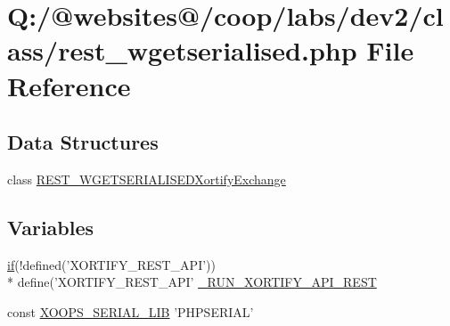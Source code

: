 \hypertarget{rest__wgetserialised_8php}{\section{Q\-:/@websites@/coop/labs/dev2/class/rest\-\_\-wgetserialised.php File Reference}
\label{rest__wgetserialised_8php}
}
\subsection*{Data Structures}
\begin{DoxyCompactItemize}
\item 
class \hyperlink{class_r_e_s_t___w_g_e_t_s_e_r_i_a_l_i_s_e_d_xortify_exchange}{R\-E\-S\-T\-\_\-\-W\-G\-E\-T\-S\-E\-R\-I\-A\-L\-I\-S\-E\-D\-Xortify\-Exchange}
\end{DoxyCompactItemize}
\subsection*{Variables}
\begin{DoxyCompactItemize}
\item 
\hyperlink{index_8php_ae2ccdf355624402b65fc2226f2a661cd}{if}(!defined('X\-O\-R\-T\-I\-F\-Y\-\_\-\-R\-E\-S\-T\-\_\-\-A\-P\-I')) \\*
define('X\-O\-R\-T\-I\-F\-Y\-\_\-\-R\-E\-S\-T\-\_\-\-A\-P\-I' \hyperlink{rest__wgetserialised_8php_a731f04083e48e3087b2f5cad38672473}{\-\_\-\-R\-U\-N\-\_\-\-X\-O\-R\-T\-I\-F\-Y\-\_\-\-A\-P\-I\-\_\-\-R\-E\-S\-T}
\item 
const \hyperlink{rest__wgetserialised_8php_a70ad743fdbf705daf2366b5cabf7a04d}{X\-O\-O\-P\-S\-\_\-\-S\-E\-R\-I\-A\-L\-\_\-\-L\-I\-B} 'P\-H\-P\-S\-E\-R\-I\-A\-L'
\end{DoxyCompactItemize}


